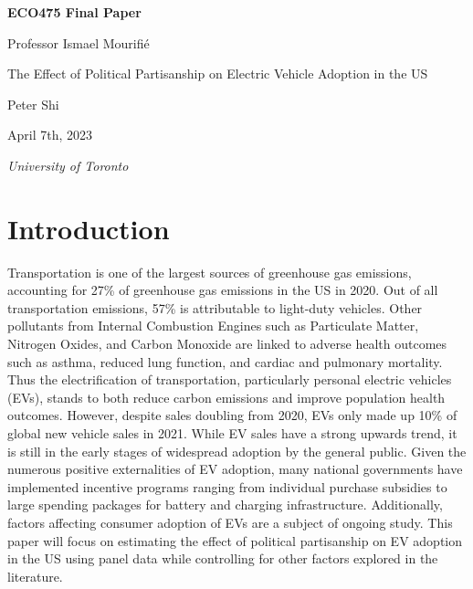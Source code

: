\documentclass{article}
\begin{document}
\begin{titlepage}
\centering

{\LARGE\bfseries ECO475 Final Paper}

\vspace{1cm}

Professor Ismael Mourifié

\vspace{1cm}

{\Large The Effect of Political Partisanship on Electric Vehicle Adoption in the US}

\vspace{2cm}

{\large Peter Shi}

April 7th, 2023

\vfill

{\itshape University of Toronto}
\end{titlepage}

\newpage
\raggedright

\setlength{\parindent}{20pt}
\section{Introduction}

Transportation is one of the largest sources of greenhouse gas emissions, accounting for 27\% of greenhouse gas emissions in the US in 2020. Out of all transportation emissions, 57\% is attributable to light-duty vehicles. \autocite{EPA} Other pollutants from Internal Combustion Engines such as Particulate Matter, Nitrogen Oxides, and Carbon Monoxide are linked to adverse health outcomes such as asthma, reduced lung function, and cardiac and pulmonary mortality. \autocite{brugge_durant_rioux_2007} Thus the electrification of transportation, particularly personal electric vehicles (EVs), stands to both reduce carbon emissions and improve population health outcomes. However, despite sales doubling from 2020, EVs only made up 10\% of global new vehicle sales in 2021. \autocite{iea_2022} While EV sales have a strong upwards trend, it is still in the early stages of widespread adoption by the general public. Given the numerous positive externalities of EV adoption, many national governments have implemented incentive programs ranging from individual purchase subsidies to large spending packages for battery and charging infrastructure. \autocite{iea_2022} Additionally, factors affecting consumer adoption of EVs are a subject of ongoing study. This paper will focus on estimating the effect of political partisanship on EV adoption in the US using panel data while controlling for other factors explored in the literature.
\end{document}
